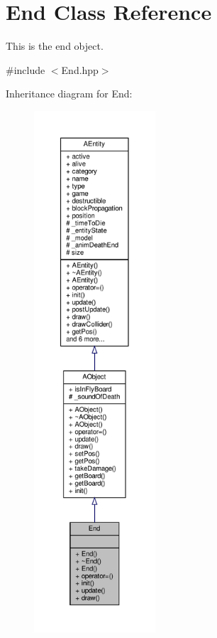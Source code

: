 \hypertarget{class_end}{}\section{End Class Reference}
\label{class_end}


This is the end object.  




{\ttfamily \#include $<$End.\+hpp$>$}



Inheritance diagram for End\+:
\nopagebreak
\begin{figure}[H]
\begin{center}
\leavevmode
\includegraphics[height=550pt]{class_end__inherit__graph}
\end{center}
\end{figure}


